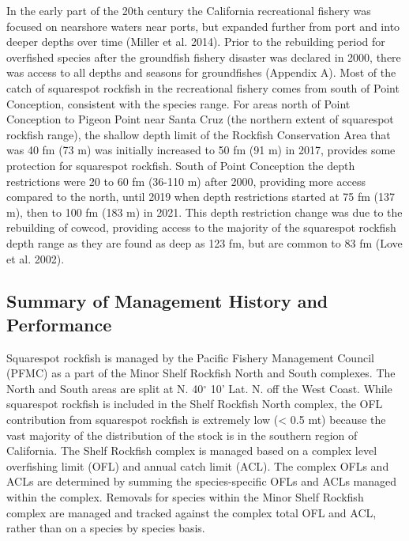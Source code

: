 \documentclass[11pt,
  english,
  a4paper,
]{article}
\begin{document}
In the early part of the 20th century the California recreational fishery was focused on nearshore waters near ports, but expanded further from port and into deeper depths over time {(Miller et al. 2014)\leavevmode\tagmcend\tagstructend}. Prior to the rebuilding period for overfished species after the groundfish fishery disaster was declared in 2000, there was access to all depths and seasons for groundfishes (Appendix A). Most of the catch of squarespot rockfish in the recreational fishery comes from south of Point Conception, consistent with the species range. For areas north of Point Conception to Pigeon Point near Santa Cruz (the northern extent of squarespot rockfish range), the shallow depth limit of the Rockfish Conservation Area that was 40 fm (73 m) was initially increased to 50 fm (91 m) in 2017, provides some protection for squarespot rockfish. South of Point Conception the depth restrictions were 20 to 60 fm (36-110 m) after 2000, providing more access compared to the north, until 2019 when depth restrictions started at 75 fm (137 m), then to 100 fm (183 m) in 2021. This depth restriction change was due to the rebuilding of cowcod, providing access to the majority of the squarespot rockfish depth range as they are found as deep as 123 fm, but are common to 83 fm {(Love et al. 2002)\leavevmode\tagmcend\tagstructend}.

\leavevmode\tagmcend\tagstructend\par


\hypertarget{summary-of-management-history-and-performance}{%
\subsection{Summary of Management History and Performance}\label{summary-of-management-history-and-performance}}

\leavevmode\tagmcend\tagstructend


Squarespot rockfish is managed by the Pacific Fishery Management Council (PFMC) as a part of the Minor Shelf Rockfish North and South complexes. The North and South areas are split at N. 40{\(^\circ\)\leavevmode\tagmcend\tagstructend} 10' Lat. N. off the West Coast. While squarespot rockfish is included in the Shelf Rockfish North complex, the OFL contribution from squarespot rockfish is extremely low (\textless{} 0.5 mt) because the vast majority of the distribution of the stock is in the southern region of California. The Shelf Rockfish complex is managed based on a complex level overfishing limit (OFL) and annual catch limit (ACL). The complex OFLs and ACLs are determined by summing the species-specific OFLs and ACLs managed within the complex. Removals for species within the Minor Shelf Rockfish complex are managed and tracked against the complex total OFL and ACL, rather than on a species by species basis.
\end{document}
